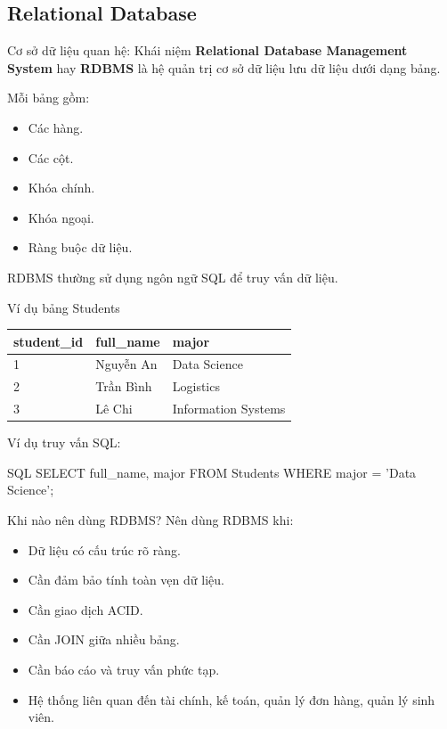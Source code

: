 \documentclass[aspectratio=169,11pt]{beamer}
\newcommand{\keyword}[1]{\textcolor{accent}{\textbf{#1}}}
\newcommand{\kw}[1]{\keyword{#1}}
\newcommand{\smallitem}{\setlength{\itemsep}{2pt}\setlength{\parskip}{0pt}}
\begin{document}
\subsection{Relational Database}

\begin{frame}{Cơ sở dữ liệu quan hệ: Khái niệm}
\kw{Relational Database Management System} hay \kw{RDBMS} là hệ quản trị cơ sở dữ liệu lưu dữ liệu dưới dạng bảng.

\vspace{2mm}
Mỗi bảng gồm:
\begin{itemize}
  \smallitem
  \item Các hàng.
  \item Các cột.
  \item Khóa chính.
  \item Khóa ngoại.
  \item Ràng buộc dữ liệu.
\end{itemize}

RDBMS thường sử dụng ngôn ngữ SQL để truy vấn dữ liệu.
\end{frame}

\begin{frame}{Ví dụ bảng Students}
\scriptsize
\begin{center}
\begin{tabular}{lll}
\toprule
\textbf{student\_id} & \textbf{full\_name} & \textbf{major} \\
\midrule
1 & Nguyễn An & Data Science \\
2 & Trần Bình & Logistics \\
3 & Lê Chi & Information Systems \\
\bottomrule
\end{tabular}
\end{center}

\vspace{2mm}
Ví dụ truy vấn SQL:
\begin{block}{SQL}
\ttfamily SELECT full\_name, major FROM Students WHERE major = 'Data Science';
\end{block}
\end{frame}

\begin{frame}{Khi nào nên dùng RDBMS?}
Nên dùng RDBMS khi:
\begin{itemize}
  \smallitem
  \item Dữ liệu có cấu trúc rõ ràng.
  \item Cần đảm bảo tính toàn vẹn dữ liệu.
  \item Cần giao dịch ACID.
  \item Cần JOIN giữa nhiều bảng.
  \item Cần báo cáo và truy vấn phức tạp.
  \item Hệ thống liên quan đến tài chính, kế toán, quản lý đơn hàng, quản lý sinh viên.
\end{itemize}
\end{frame}
\end{document}
